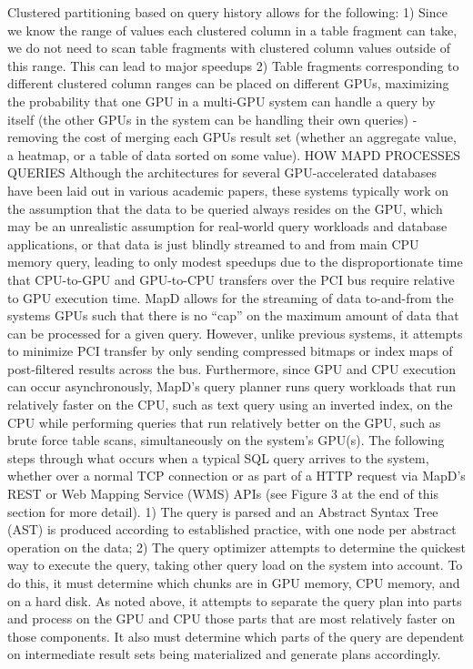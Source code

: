 \documentclass[twocolumn]{article}
\begin{document}
Clustered partitioning based on query history allows for the following:
1) Since we know the range of values each clustered column in a table fragment can take, we do not need to scan table fragments with clustered column values outside of this range. This can lead to major speedups
2) Table fragments corresponding to different clustered column ranges can be placed on different GPUs, maximizing the probability that one GPU in a multi-GPU system can handle a query by itself (the other GPUs in the system can be handling their own queries) - removing the cost of merging each GPUs result set (whether an aggregate value, a heatmap, or a table of data sorted on some value).
HOW MAPD PROCESSES QUERIES
Although the architectures for several GPU-accelerated databases have been laid out in various academic papers, these systems typically work on the assumption that the data to be queried always resides on the GPU, which may be an unrealistic assumption for real-world query workloads and database applications, or that data is just blindly streamed to and from main CPU memory query, leading to only modest speedups due to the disproportionate time that CPU-to-GPU and GPU-to-CPU transfers over the PCI bus require relative to GPU execution time. MapD allows for the streaming of data to-and-from the systems GPUs such that there is no “cap” on the maximum amount of data that can be processed for a given query. However, unlike previous systems, it attempts to minimize PCI transfer by only sending compressed bitmaps or index maps of post-filtered results across the bus. Furthermore, since GPU and CPU execution can occur asynchronously, MapD’s query planner runs query workloads that run relatively faster on the CPU, such as text query using an inverted index, on the CPU while performing queries that run relatively better on the GPU, such as brute force table scans, simultaneously on the system’s GPU(s).
The following steps through what occurs when a typical SQL query arrives to the system, whether over a normal TCP connection or as part of a HTTP request via MapD’s REST or Web Mapping Service (WMS) APIs (see Figure 3 at the end of this section for more detail).
1) The query is parsed and an Abstract Syntax Tree (AST) is produced according to established practice, with one node per abstract operation on the data;
2) The query optimizer attempts to determine the quickest way to execute the query, taking other query load on the system into account. To do this, it must determine which chunks are in GPU memory, CPU memory, and on a hard disk. As noted above, it attempts to separate the query plan into parts and process on the GPU and CPU those parts that are most relatively faster on those components. It also must determine which parts of the query are dependent on intermediate result sets being materialized and generate plans accordingly.
\end{document}
